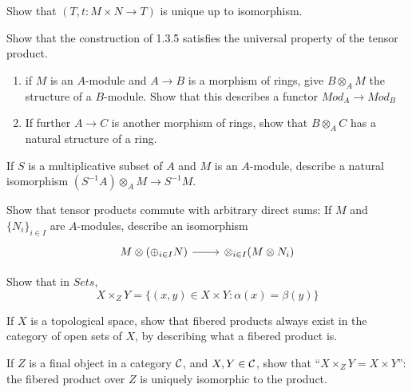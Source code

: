 \begin{exercise}
    Show that $(T, t: M \times N \to T)$ is unique up to isomorphism.
\end{exercise}

\begin{exercise}
    Show that the construction of 1.3.5 satisfies the universal property of the tensor product. 
\end{exercise}

\begin{exercise}\mbox{}
    \begin{enumerate}[label= (\alph*)]
        \item if $M$ is an $A$-module and $A \to B$ is a morphism of rings, give $B \otimes_A M$ the structure of a $B$-module. Show that this describes a functor $Mod_A \to Mod_B$
        \item If further $A \to C$ is another morphism of rings, show that $B \otimes_A C$ has a natural structure of a ring. 
    \end{enumerate}
\end{exercise}

\begin{exercise}
    If $S$ is a multiplicative subset of $A$ and $M$ is an $A$-module, describe a natural isomorphism $(S^{-1}A)\otimes_A M \to S^{-1}M$. 
\end{exercise}

\begin{exercise}
    Show that tensor products commute with arbitrary direct sums: If $M$ and $\{N_i\}_{i \in I}$ are $A$-modules, describe an isomorphism 
    \[ \begin{tikzcd}
        M \otimes (\oplus_{i \in I}N) \arrow[r] & \otimes_{i \in I}(M \otimes N_i)
    \end{tikzcd} \]
\end{exercise}

\begin{exercise}
    Show that in $Sets$, 
    \[ X \times_Z Y = \{ (x, y) \in X \times Y \colon \alpha(x) = \beta(y) \} \]
\end{exercise}

\begin{exercise}
    If $X$ is a topological space, show that fibered products always exist in the category of open sets of $X$, by describing what a fibered product is. 
\end{exercise}

\begin{exercise}
    If $Z$ is a final object in a category $\mathcal{C}$, and $X, Y \in \mathcal{C}$, show that ``$X \times_Z Y = X \times Y$'': the fibered product over $Z$ is uniquely isomorphic to the product. 
\end{exercise}

